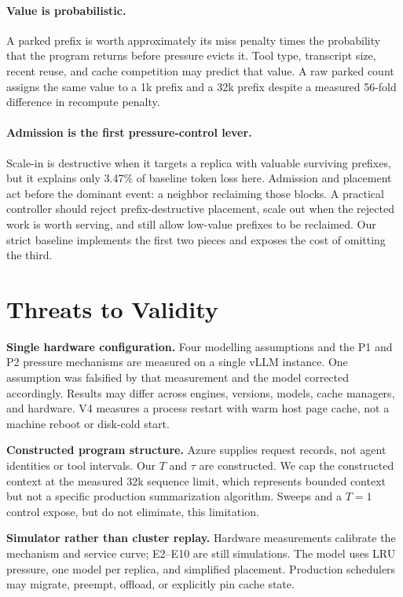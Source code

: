\documentclass[sigconf,nonacm]{acmart}
\begin{document}
\paragraph{Value is probabilistic.}
A parked prefix is worth approximately its miss penalty times the probability
that the program returns before pressure evicts it. Tool type, transcript size,
recent reuse, and cache competition may predict that value. A raw parked count
assigns the same value to a 1k prefix and a 32k prefix despite a measured
56-fold difference in recompute penalty.

\paragraph{Admission is the first pressure-control lever.}
Scale-in is destructive when it targets a replica with valuable surviving
prefixes, but it explains only 3.47\% of baseline token loss here. Admission
and placement act before the dominant event: a neighbor reclaiming those
blocks. A practical controller should reject prefix-destructive placement,
scale out when the rejected work is worth serving, and still allow low-value
prefixes to be reclaimed. Our strict baseline implements the first two pieces
and exposes the cost of omitting the third.

\section{Threats to Validity}
\label{sec:threats}

\textbf{Single hardware configuration.} Four modelling assumptions and the P1
and P2 pressure mechanisms are
measured on a single vLLM instance. One assumption was falsified by that
measurement and the model corrected accordingly. Results may differ across
engines, versions, models, cache managers, and hardware. V4 measures a process
restart with warm host page cache, not a machine reboot or disk-cold start.

\textbf{Constructed program structure.} Azure supplies request records, not
agent identities or tool intervals. Our $T$ and $\tau$ are constructed. We cap
the constructed context at the measured 32k sequence limit, which represents
bounded context but not a specific production summarization algorithm. Sweeps
and a $T=1$ control expose, but do not eliminate, this limitation.

\textbf{Simulator rather than cluster replay.} Hardware measurements calibrate
the mechanism and service curve; E2--E10 are still simulations. The model uses
LRU pressure, one model per replica, and simplified placement. Production
schedulers may migrate, preempt, offload, or explicitly pin cache state.
\end{document}
